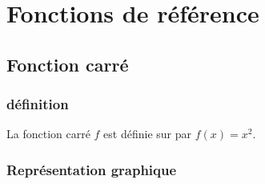 \chapter{Fonctions de référence}
\thispagestyle{fancy}

\graphicspath{{images/}}

\section{Fonction carré}
    \subsection{définition}
    \begin{bdefi}
        La fonction carré $f$ est définie sur \R par $f(x)=x^2$.
    \end{bdefi}
    
    \subsection{Représentation graphique}
    
